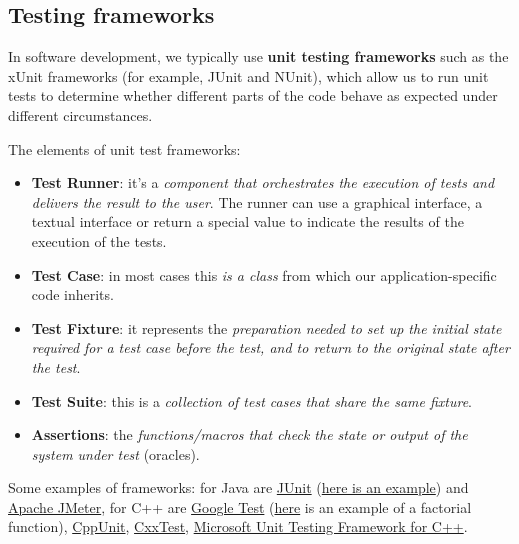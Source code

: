 \subsection{Testing frameworks}

In software development, we typically use \textbf{unit testing frameworks} such as the xUnit frameworks (for example, JUnit and NUnit), which allow us to run unit tests to determine whether different parts of the code behave as expected under different circumstances.

\highspace
The elements of unit test frameworks:
\begin{itemize}
    \item \textbf{Test Runner}: it's a \emph{component that orchestrates the execution of tests and delivers the result to the user}. The runner can use a graphical interface, a textual interface or return a special value to indicate the results of the execution of the tests.
    
    \item \textbf{Test Case}: in most cases this \emph{is a class} from which our application-specific code inherits.

    \item \textbf{Test Fixture}: it represents the \emph{preparation needed to set up the initial state required for a test case before the test, and to return to the original state after the test}.
    
    \item \textbf{Test Suite}: this is a \emph{collection of test cases that share the same fixture}.
    
    \item \textbf{Assertions}: the \emph{functions/macros that check the state or output of the system under test} (oracles).
\end{itemize}
Some examples of frameworks: for Java are \href{https://en.wikipedia.org/wiki/JUnit}{JUnit} (\href{https://junit.org/junit5/docs/current/user-guide/#writing-tests}{here is an example}) and \href{https://jmeter.apache.org/}{Apache JMeter}, for C++ are \href{https://google.github.io/googletest/}{Google Test} (\href{https://google.github.io/googletest/primer.html#simple-tests}{here} is an example of a factorial function), \href{https://en.wikipedia.org/wiki/CppUnit}{CppUnit}, \href{https://github.com/CxxTest/cxxtest}{CxxTest}, \href{https://learn.microsoft.com/en-us/visualstudio/test/writing-unit-tests-for-c-cpp?view=vs-2022}{Microsoft Unit Testing Framework for C++}.